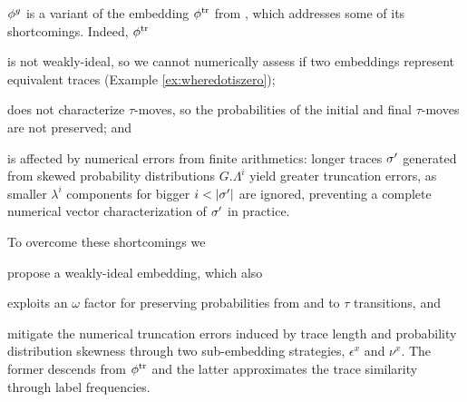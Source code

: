 ${\phi^{g}}$ is a variant of the embedding ${\phi^{\text{tr}}}$ from \cite{LodhiSSCW02}, which addresses some of its shortcomings.
Indeed, ${\phi^{\text{tr}}}$
\begin{alphalist}
 \item is not weakly-ideal, so we cannot numerically assess if two embeddings represent equivalent traces 
 (Example \ref{ex:wheredotiszero});
 \item does not characterize $\tau$-moves, so the probabilities of the initial and final $\tau$-moves are not preserved; and
 \item is affected by numerical errors from finite arithmetics: longer traces ${\sigma'}$ generated from skewed probability 
 	distributions $G.\Lambda^i$ yield greater truncation errors, as smaller $\lambda^i$ components for bigger 
 	$i<|\nonlogtrace|$ are ignored, preventing a complete numerical vector characterization of  ${\sigma'}$ in practice.
\end{alphalist}
%
To overcome these shortcomings we 
\begin{alphalist} 
\item propose a weakly-ideal embedding, which also 
\item exploits an $\omega$ factor for preserving probabilities from and to $\tau$ transitions, and 
\item mitigate the numerical truncation errors induced by trace length and probability distribution skewness through two 
sub-embedding strategies, $\epsilon^x$ and $\nu^x$. The former descends from ${\phi^{\text{tr}}}$ and the latter approximates 
the trace similarity through label frequencies.
\end{alphalist}


